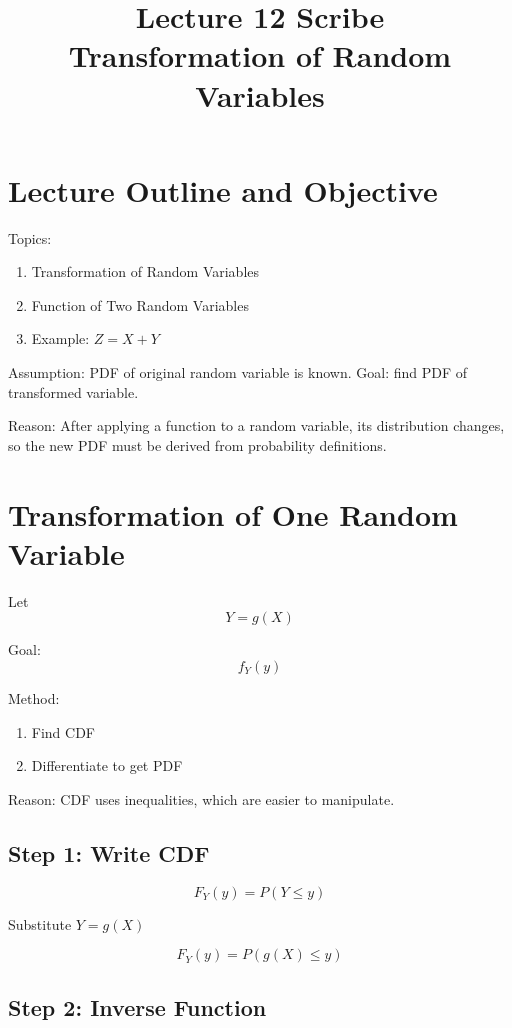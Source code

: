 \documentclass[12pt]{article}
\title{Lecture 12 Scribe \\ Transformation of Random Variables}
\author{}
\date{}
\begin{document}
\maketitle

\section{Lecture Outline and Objective}

Topics:

\begin{enumerate}
\item Transformation of Random Variables
\item Function of Two Random Variables
\item Example: $Z = X + Y$
\end{enumerate}

Assumption:
PDF of original random variable is known.  
Goal: find PDF of transformed variable.

Reason:
After applying a function to a random variable, its distribution changes,
so the new PDF must be derived from probability definitions.

\section{Transformation of One Random Variable}

Let
\[
Y = g(X)
\]

Goal:
\[
f_Y(y)
\]

Method:

\begin{enumerate}
\item Find CDF
\item Differentiate to get PDF
\end{enumerate}

Reason:
CDF uses inequalities, which are easier to manipulate.

\subsection{Step 1: Write CDF}

\[
F_Y(y) = P(Y \le y)
\]

Substitute $Y = g(X)$

\[
F_Y(y) = P(g(X) \le y)
\]

\subsection{Step 2: Inverse Function}
\end{document}

